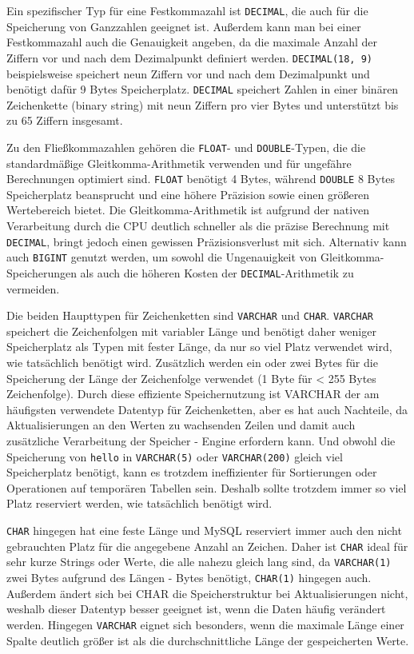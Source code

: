 Ein spezifischer Typ für eine Festkommazahl ist \texttt{DECIMAL}, die auch für die Speicherung von Ganzzahlen geeignet ist.
Außerdem kann man bei einer Festkommazahl auch die Genauigkeit angeben, da die maximale Anzahl der Ziffern vor und nach dem Dezimalpunkt definiert werden.
\texttt{DECIMAL(18, 9)} beispielsweise speichert neun Ziffern vor und nach dem Dezimalpunkt und benötigt dafür 9 Bytes Speicherplatz.
\texttt{DECIMAL} speichert Zahlen in einer binären Zeichenkette (binary string) mit neun Ziffern pro vier Bytes und unterstützt bis zu 65 Ziffern insgesamt.

Zu den Fließkommazahlen gehören die \texttt{FLOAT}- und \texttt{DOUBLE}-Typen, die die standardmäßige Gleitkomma-Arithmetik verwenden und für ungefähre Berechnungen optimiert sind.
\texttt{FLOAT} benötigt 4 Bytes, während \texttt{DOUBLE} 8 Bytes Speicherplatz beansprucht und eine höhere Präzision sowie einen größeren Wertebereich bietet.
Die Gleitkomma-Arithmetik ist aufgrund der nativen Verarbeitung durch die CPU deutlich schneller als die präzise Berechnung mit \texttt{DECIMAL}, bringt jedoch einen gewissen Präzisionsverlust mit sich.
Alternativ kann auch \texttt{BIGINT} genutzt werden, um sowohl die Ungenauigkeit von Gleitkomma-Speicherungen als auch die höheren Kosten der \texttt{DECIMAL}-Arithmetik zu vermeiden.

Die beiden Haupttypen für Zeichenketten sind \texttt{VARCHAR} und \texttt{CHAR}. \texttt{VARCHAR} speichert die Zeichenfolgen mit variabler Länge und benötigt daher weniger Speicherplatz als Typen mit fester Länge, da nur so viel Platz verwendet wird, wie tatsächlich benötigt wird.
Zusätzlich werden ein oder zwei Bytes für die Speicherung der Länge der Zeichenfolge verwendet (1 Byte für < 255 Bytes Zeichenfolge).
Durch diese effiziente Speichernutzung ist VARCHAR der am häufigsten verwendete Datentyp für Zeichenketten, aber es hat auch Nachteile, da Aktualisierungen an den Werten zu wachsenden Zeilen und damit auch zusätzliche Verarbeitung der Speicher - Engine erfordern kann.
Und obwohl die Speicherung von \texttt{hello} in \texttt{VARCHAR(5)} oder \texttt{VARCHAR(200)} gleich viel Speicherplatz benötigt, kann es trotzdem ineffizienter für Sortierungen oder Operationen auf temporären Tabellen sein.
Deshalb sollte trotzdem immer so viel Platz reserviert werden, wie tatsächlich benötigt wird.

\texttt{CHAR} hingegen hat eine feste Länge und MySQL reserviert immer auch den nicht gebrauchten Platz für die angegebene Anzahl an Zeichen.
Daher ist \texttt{CHAR} ideal für sehr kurze Strings oder Werte, die alle nahezu gleich lang sind, da \texttt{VARCHAR(1)} zwei Bytes aufgrund des Längen - Bytes benötigt, \texttt{CHAR(1)} hingegen auch.
Außerdem ändert sich bei CHAR die Speicherstruktur bei Aktualisierungen nicht, weshalb dieser Datentyp besser geeignet ist, wenn die Daten häufig verändert werden.
Hingegen \texttt{VARCHAR} eignet sich besonders, wenn die maximale Länge einer Spalte deutlich größer ist als die durchschnittliche Länge der gespeicherten Werte.

